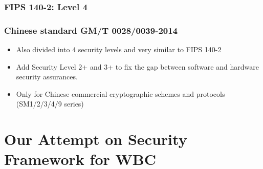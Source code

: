 \documentclass{beamer}
\begin{document}
\frame
{
\frametitle{FIPS 140-2: Level 4}

\begin{center}
\end{center}

}

\frame
{
\frametitle{Chinese standard GM/T 0028/0039-2014}
\begin{itemize}
\setlength{\itemsep}{12pt}
\item Also divided into 4 security levels and very similar to FIPS 140-2

\item Add Security Level 2+ and 3+ to fix the gap between software and hardware security assurances.

\item Only for Chinese commercial cryptographic schemes and protocols (SM1/2/3/4/9 series)

\end{itemize}
}

\section{Our Attempt on Security Framework for WBC}

\end{document}
